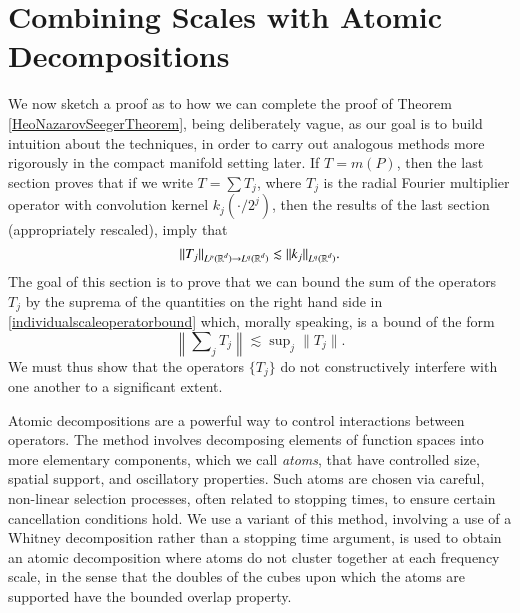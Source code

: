 \section{Combining Scales with Atomic Decompositions} \label{sec:combining_scales_with_atomic_decompositions}

We now sketch a proof as to how we can complete the proof of Theorem \ref{HeoNazarovSeegerTheorem}, being deliberately vague, as our goal is to build intuition about the techniques, in order to carry out analogous methods more rigorously in the compact manifold setting later. If $T = m(P)$, then the last section proves that if we write $T = \sum T_j$, where $T_j$ is the radial Fourier multiplier operator with convolution kernel $k_j(\cdot/2^j)$, then the results of the last section (appropriately rescaled), imply that
%
\begin{equation} \label{individualscaleoperatorbound}
    \| T_j \|_{L^p(\operatorname{\mathbb{R}}^d) \to L^q(\operatorname{\mathbb{R}}^d)} \lesssim \| k_j \|_{L^q(\operatorname{\mathbb{R}}^d)}.
\end{equation}
%
The goal of this section is to prove that we can bound the sum of the operators $T_j$ by the suprema of the quantities on the right hand side in \eqref{individualscaleoperatorbound} which, morally speaking, is a bound of the form
%
\[ \left\| \sum\nolimits_j T_j \right\| \lesssim \sup\nolimits_j \| T_j \|. \]
%
We must thus show that the operators $\{ T_j \}$ do not constructively interfere with one another to a significant extent.

Atomic decompositions are a powerful way to control interactions between operators. The method involves decomposing elements of function spaces into more elementary components, which we call \emph{atoms}, that have controlled size, spatial support, and oscillatory properties. Such atoms are chosen via careful, non-linear selection processes, often related to stopping times, to ensure certain cancellation conditions hold. We use a variant of this method, involving a use of a Whitney decomposition rather than a stopping time argument, is used to obtain an atomic decomposition where atoms do not cluster together at each frequency scale, in the sense that the doubles of the cubes upon which the atoms are supported have the bounded overlap property.

